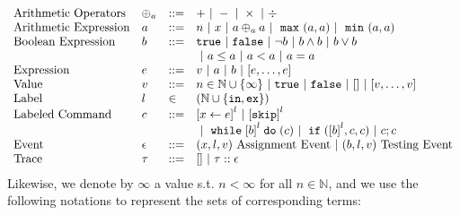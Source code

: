 \[
\begin{array}{llll}
\mbox{Arithmetic Operators} 
& \oplus_a & ::= & + ~|~ - ~|~ \times 
%
~|~ \div
\\  
\mbox{Arithmetic Expression} 
& \aexpr & ::= & 
n ~|~ {x} ~|~ \aexpr \oplus_a \aexpr  ~|~ \emax (a, a) ~|~ \emin(a, a)
\\
\mbox{Boolean Expression} & \bexpr & ::= & 
%
\etrue ~|~ \efalse  ~|~ \neg \bexpr
 ~|~ \bexpr \land \bexpr
%
~|~ \bexpr \lor \bexpr 
\\
& & &
~|~ \aexpr \leq \aexpr 
~|~ \aexpr < \aexpr 
~|~ \aexpr = \aexpr 
\\
\mbox{Expression} & \expr & ::= & v ~|~ \aexpr ~|~ \bexpr ~|~ [\expr, \dots, \expr]
\\  
%
\mbox{Value} 
& v & ::= & { n \in \mathbb{N} \cup \{\infty\} ~|~ \etrue ~|~ \efalse ~|~ [] ~|~ [v, \dots, v]} \\
%
\mbox{Label} 
& l & \in & (\mathbb{N} \cup \{\lin, \lex\}) 
\\ 
%
\mbox{Labeled Command} 
& {c} & ::= &  
\clabel{\assign{x}{\expr}}^l 
~|~  \clabel{\eskip}^l 
\\
& & &
~|~ \ewhile \clabel{\bexpr}^{l} \edo ({c})
~|~ \eif(\clabel{\bexpr}^{l} , {c}, {c}) 
~|~ {c};{c}  
\\ 
\mbox{Event} 
& \event & ::= & 
({x}, l, v) ~ \mbox{Assignment Event} 
~|~(\bexpr, l, v) ~ \mbox{Testing Event}
\\
\mbox{Trace} & \trace
& ::= & [] ~|~ \trace :: \event
\\
\end{array}
\]
Likewise, we denote by $\infty$ a value s.t. $n < \infty $ for all $n \in \mathbb{N}$, and we use the following notations to represent the sets of corresponding terms:
